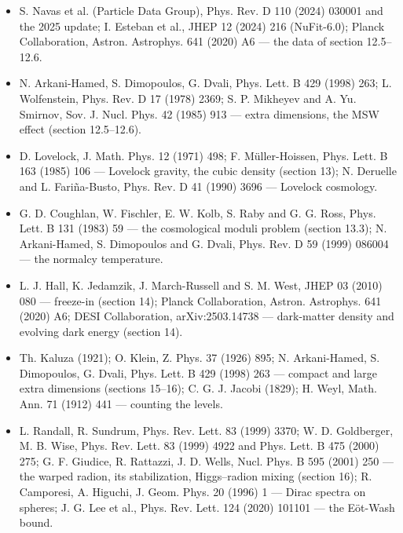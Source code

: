\documentclass[10pt,a4paper]{article}
\begin{document}
\begin{itemize}
\item S. Navas et al. (Particle Data Group), Phys. Rev. D 110 (2024) 030001 and the 2025 update; I. Esteban et al., JHEP 12 (2024) 216 (NuFit-6.0); Planck Collaboration, Astron. Astrophys. 641 (2020) A6 — the data of section 12.5–12.6.
\item N. Arkani-Hamed, S. Dimopoulos, G. Dvali, Phys. Lett. B 429 (1998) 263; L. Wolfenstein, Phys. Rev. D 17 (1978) 2369; S. P. Mikheyev and A. Yu. Smirnov, Sov. J. Nucl. Phys. 42 (1985) 913 — extra dimensions, the MSW effect (section 12.5–12.6).
\item D. Lovelock, J. Math. Phys. 12 (1971) 498; F. Müller-Hoissen, Phys. Lett. B 163 (1985) 106 — Lovelock gravity, the cubic density (section 13); N. Deruelle and L. Fariña-Busto, Phys. Rev. D 41 (1990) 3696 — Lovelock cosmology.
\item G. D. Coughlan, W. Fischler, E. W. Kolb, S. Raby and G. G. Ross, Phys. Lett. B 131 (1983) 59 — the cosmological moduli problem (section 13.3); N. Arkani-Hamed, S. Dimopoulos and G. Dvali, Phys. Rev. D 59 (1999) 086004 — the normalcy temperature.
\item L. J. Hall, K. Jedamzik, J. March-Russell and S. M. West, JHEP 03 (2010) 080 — freeze-in (section 14); Planck Collaboration, Astron. Astrophys. 641 (2020) A6; DESI Collaboration, arXiv:2503.14738 — dark-matter density and evolving dark energy (section 14).
\item Th. Kaluza (1921); O. Klein, Z. Phys. 37 (1926) 895; N. Arkani-Hamed, S. Dimopoulos, G. Dvali, Phys. Lett. B 429 (1998) 263 — compact and large extra dimensions (sections 15–16); C. G. J. Jacobi (1829); H. Weyl, Math. Ann. 71 (1912) 441 — counting the levels.
\item L. Randall, R. Sundrum, Phys. Rev. Lett. 83 (1999) 3370; W. D. Goldberger, M. B. Wise, Phys. Rev. Lett. 83 (1999) 4922 and Phys. Lett. B 475 (2000) 275; G. F. Giudice, R. Rattazzi, J. D. Wells, Nucl. Phys. B 595 (2001) 250 — the warped radion, its stabilization, Higgs–radion mixing (section 16); R. Camporesi, A. Higuchi, J. Geom. Phys. 20 (1996) 1 — Dirac spectra on spheres; J. G. Lee et al., Phys. Rev. Lett. 124 (2020) 101101 — the Eöt-Wash bound.
\end{itemize}
\end{document}
